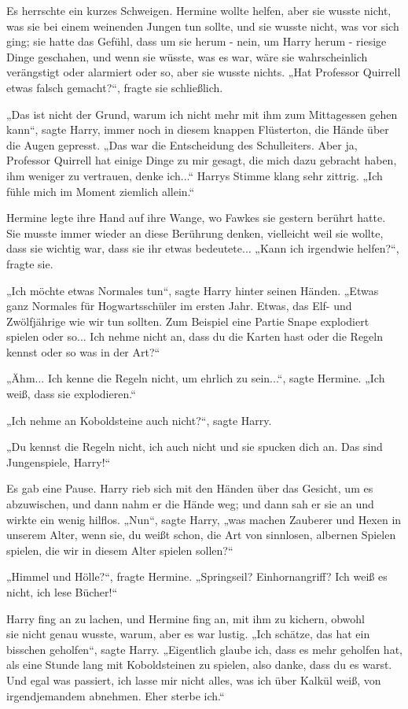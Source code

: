 {Es herrschte ein kurzes Schweigen. Hermine wollte helfen, aber sie wusste nicht, was sie bei einem weinenden Jungen tun sollte, und sie wusste nicht, was vor sich ging; sie hatte das Gefühl, dass um sie herum - nein, um Harry herum - riesige Dinge geschahen, und wenn sie wüsste, was es war, wäre sie wahrscheinlich verängstigt oder alarmiert oder so, aber sie wusste nichts. „Hat Professor Quirrell etwas falsch gemacht?“, fragte sie schließlich.

„Das ist nicht der Grund, warum ich nicht mehr mit ihm zum Mittagessen gehen kann“, sagte Harry, immer noch in diesem knappen Flüsterton, die Hände über die Augen gepresst. „Das war die Entscheidung des Schulleiters. Aber ja, Professor Quirrell hat einige Dinge zu mir gesagt, die mich dazu gebracht haben, ihm weniger zu vertrauen, denke ich...“ Harrys Stimme klang sehr zittrig. „Ich fühle mich im Moment ziemlich allein.“

Hermine legte ihre Hand auf ihre Wange, wo Fawkes sie gestern berührt hatte. Sie musste immer wieder an diese Berührung denken, vielleicht weil sie wollte, dass sie wichtig war, dass sie ihr etwas bedeutete... „Kann ich irgendwie helfen?“, fragte sie.

„Ich möchte etwas Normales tun“, sagte Harry hinter seinen Händen. „Etwas ganz Normales für Hogwartsschüler im ersten Jahr. Etwas, das Elf- und Zwölfjährige wie wir tun sollten. Zum Beispiel eine Partie Snape explodiert spielen oder so... Ich nehme nicht an, dass du die Karten hast oder die Regeln kennst oder so was in der Art?“

„Ähm... Ich kenne die Regeln nicht, um ehrlich zu sein...“, sagte Hermine. „Ich weiß, dass sie explodieren.“

„Ich nehme an Koboldsteine auch nicht?“, sagte Harry.

„Du kennst die Regeln nicht, ich auch nicht und sie spucken dich an. Das sind Jungenspiele, Harry!“

Es gab eine Pause. Harry rieb sich mit den Händen über das Gesicht, um es abzuwischen, und dann nahm er die Hände weg; und dann sah er sie an und wirkte ein wenig hilflos. „Nun“, sagte Harry, „was machen Zauberer und Hexen in unserem Alter, wenn sie, du weißt schon, die Art von sinnlosen, albernen Spielen spielen, die wir in diesem Alter spielen sollen?“

„Himmel und Hölle?“, fragte Hermine. „Springseil? Einhornangriff? Ich weiß es nicht, ich lese Bücher!“

Harry fing an zu lachen, und Hermine fing an, mit ihm zu kichern, obwohl\\ sie nicht genau wusste, warum, aber es war lustig. „Ich schätze, das hat ein bisschen geholfen“, sagte Harry. „Eigentlich glaube ich, dass es mehr geholfen hat, als eine Stunde lang mit Koboldsteinen zu spielen, also danke, dass du es warst. Und egal was passiert, ich lasse mir nicht alles, was ich über Kalkül weiß, von irgendjemandem abnehmen. Eher sterbe ich.“

}
